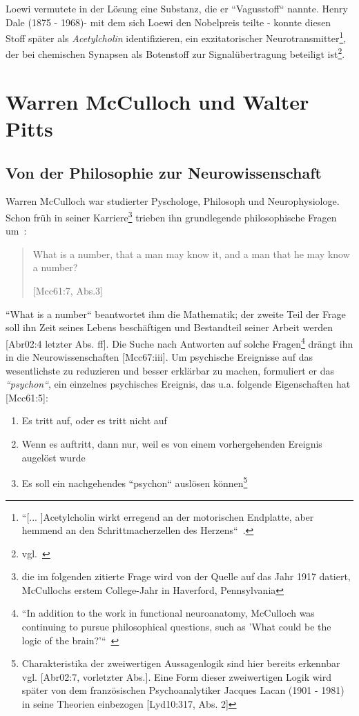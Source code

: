 Loewi vermutete in der Lösung eine Substanz, die er ``Vagusstoff`` nannte.
Henry Dale (1875 - 1968)- mit dem sich Loewi den Nobelpreis teilte - konnte diesen Stoff später als \textit{Acetylcholin} identifizieren, ein exzitatorischer Neurotransmitter\footnote{
    ``[... ]Acetylcholin wirkt erregend an der motorischen Endplatte, aber hemmend an den Schrittmacherzellen des Herzens``~\cite[105]{HS19b}.
}, der bei chemischen Synapsen als Botenstoff zur Signalübertragung beteiligt ist\footnote{
    vgl.~\cite[119, Exkurs 5.1]{BCP18}
}.

\section{Warren McCulloch und Walter Pitts}\label{appendix:mcculloch}
\subsection*{Von der Philosophie zur Neurowissenschaft}

Warren McCulloch war studierter Pyschologe, Philosoph und Neurophysiologe.
Schon früh in seiner Karriere\footnote{
    die im folgenden zitierte Frage wird von der Quelle auf das Jahr 1917 datiert, McCullochs erstem College-Jahr in Haverford, Pennsylvania
} trieben ihn grundlegende philosophische Fragen um~\cite[1]{Arb19}:

\blockquote[{[Mcc61:7, Abs.3]}]{
    What is a number, that a man may know it, and a man that he may know a number{?}
}

\noindent
``What is a number`` beantwortet ihm die Mathematik; der zweite Teil der Frage soll ihn Zeit seines Lebens beschäftigen und Bestandteil seiner Arbeit werden [Abr02:4 letzter Abs. ff].
Die Suche nach Antworten auf solche Fragen\footnote{
    ``In addition to the work in functional neuroanatomy, McCulloch was continuing to pursue philosophical questions, such as 'What could be the logic of the brain?'``~\cite[3]{Arb19}
} drängt ihn in die Neurowissenschaften [Mcc67:iii].
Um psychische Ereignisse auf das wesentlichste zu reduzieren und besser erklärbar zu machen, formuliert er das \textit{``psychon``}, ein einzelnes psychisches Ereignis, das u.a. folgende Eigenschaften hat [Mcc61:5]:

\begin{enumerate}
    \item Es tritt auf, oder es tritt nicht auf
    \item Wenn es auftritt, dann nur, weil es von einem vorhergehenden Ereignis augelöst wurde
    \item Es soll ein nachgehendes ``psychon`` auslösen können\footnote{
        Charakteristika der zweiwertigen Aussagenlogik sind hier bereits erkennbar vgl. [Abr02:7, vorletzter Abs.]. Eine Form dieser zweiwertigen Logik wird später von dem französischen Psychoanalytiker Jacques Lacan (1901 - 1981) in seine Theorien einbezogen [Lyd10:317, Abs. 2]
    }
\end{enumerate}


